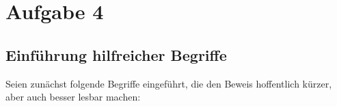 \section{Aufgabe 4}


\subsection*{Einführung hilfreicher Begriffe}

Seien zunächst folgende Begriffe eingeführt, die den Beweis hoffentlich kürzer, aber auch besser lesbar machen:

